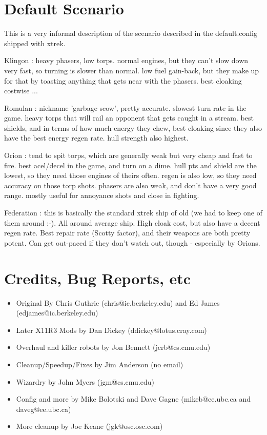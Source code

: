 \section{Default Scenario}

This is a very informal description of the scenario described
in the {\bold default.config} shipped with xtrek.

Klingon : heavy phasers, low torps. normal engines, but they
can't slow down very fast, so turning is slower than normal. low fuel
gain-back, but they make up for that by toasting anything that gets
near with the phasers. best cloaking costwise ...

Romulan : nickname 'garbage scow', pretty accurate. slowest
turn rate in the game. heavy torps that will rail an opponent that
gets caught in a stream. best shields, and in terms of how much energy
they chew, best cloaking since they also have the best energy regen
rate. hull strength also highest.

Orion : tend to spit torps, which are generally weak but very
cheap and fast to fire. best acel/decel in the game, and turn on a
dime. hull pts and shield are the lowest, so they need those engines
of theirs often. regen is also low, so they need accuracy on those
torp shots. phasers are also weak, and don't have a very good range.
mostly useful for annoyance shots and close in fighting.

Federation : this is basically the standard xtrek ship of old
(we had to keep one of them around :-). All around average ship. High
cloak cost, but also have a decent regen rate. Best repair rate
(Scotty factor), and their weapons are both pretty potent. Can get
out-paced if they don't watch out, though - especially by Orions.


\section{Credits, Bug Reports, etc}

\begin{itemize}
\item Original By Chris Guthrie (chris@ic.berkeley.edu) and Ed James (edjames@ic.berkeley.edu)
\item Later X11R3 Mods by Dan Dickey (ddickey@lotus.cray.com)  
\item Overhaul and killer robots by Jon Bennett (jcrb@cs.cmu.edu)  
\item Cleanup/Speedup/Fixes by Jim Anderson (no email)
\item Wizardry by John Myers (jgm@cs.cmu.edu)  
\item Config and more by Mike Bolotski and Dave Gagne (mikeb@ee.ubc.ca and daveg@ee.ubc.ca)
\item More cleanup by Joe Keane (jgk@osc.osc.com)
\end{itemize}



